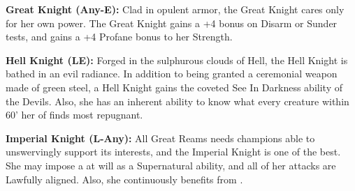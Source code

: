 \begin{itemize*}
\item \textbf{Great Knight (Any-E):}  Clad in opulent armor, the Great Knight cares only for her own power. The Great Knight gains a +4 bonus on Disarm or Sunder tests, and gains a +4 Profane bonus to her Strength.
\item \textbf{Hell Knight (LE):}  Forged in the sulphurous clouds of Hell, the Hell Knight is bathed in an evil radiance. In addition to being granted a ceremonial weapon made of green steel, a Hell Knight gains the coveted See In Darkness ability of the Devils. Also, she has an inherent ability to know what every creature within 60' her of finds most repugnant.
\item \textbf{Imperial Knight (L-Any):}  All Great Reams needs champions able to unswervingly support its interests, and the Imperial Knight is one of the best. She may impose a  at will as a Supernatural ability, and all of her attacks are Lawfully aligned. Also, she continuously benefits from .
\end{itemize*}
